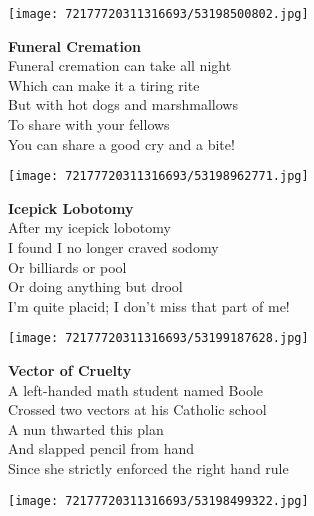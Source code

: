\documentclass[10pt,letterpaper]{article}
\begin{document}
\begin{center}
\texttt{[image: 72177720311316693/53198500802.jpg]}
\end{center}

\begin{center}
\textbf{Funeral Cremation}\\
\vskip 0.2in
Funeral cremation can take all night\\
Which can make it a tiring rite\\
But with hot dogs and marshmallows\\
To share with your fellows\\
You can share a good cry and a bite!\\
\end{center}
\pagebreak

\begin{center}\texttt{[image: 72177720311316693/53198962771.jpg]}
\end{center}
\begin{center}
\textbf{Icepick Lobotomy}\\
\vskip 0.2in
After my icepick lobotomy\\
I found I no longer craved sodomy\\
Or billiards or pool\\
Or doing anything but drool\\
I'm quite placid; I don't miss that part of me!\\
\end{center}
\pagebreak

\begin{center}\texttt{[image: 72177720311316693/53199187628.jpg]}
\end{center}
\begin{center}
\textbf{Vector of Cruelty}\\
\vskip 0.2in
A left-handed math student named Boole\\
Crossed two vectors at his Catholic school\\
A nun thwarted this plan\\
And slapped pencil from hand\\
Since she strictly enforced the right hand rule\\
\end{center}
\pagebreak

\begin{center}
\texttt{[image: 72177720311316693/53198499322.jpg]}
\end{center}
\end{document}
